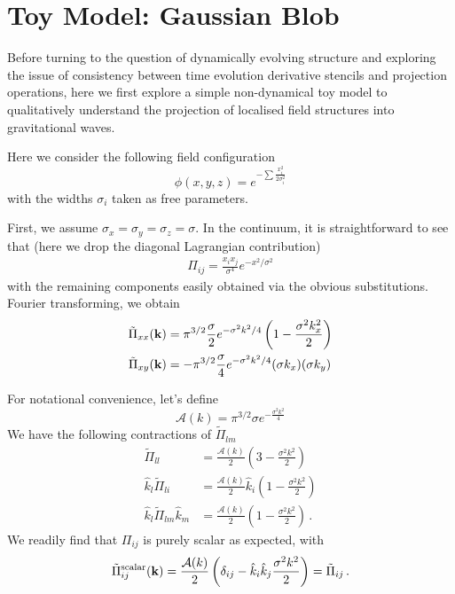 \documentclass{revtex4}
\begin{document}
\section{Toy Model: Gaussian Blob}
Before turning to the question of dynamically evolving structure and exploring the issue of consistency between time evolution derivative stencils and projection operations,
here we first explore a simple non-dynamical toy model to qualitatively understand the projection of localised field structures into gravitational waves.

Here we consider the following field configuration
\begin{equation}
  \phi(x,y,z) = e^{-\sum\frac{x_i^2}{2\sigma_i^2}}
\end{equation}
with the widths $\sigma_i$ taken as free parameters.

First, we assume $\sigma_x=\sigma_y=\sigma_z=\sigma$.
In the continuum, it is straightforward to see that (here we drop the diagonal Lagrangian contribution)
\begin{subequations}
\begin{align}
  \Pi_{ij} = \frac{x_ix_j}{\sigma^4}e^{-x^2/\sigma^2}
\end{align}
\end{subequations}
with the remaining components easily obtained via the obvious substitutions.
Fourier transforming, we obtain
\begin{align}
  \tilde{\Pi}_{xx}({\bf k}) &= \pi^{3/2}\frac{\sigma}{2}e^{-\sigma^2k^2/4}\left(1-\frac{\sigma^2k_x^2}{2}\right) \\
  \tilde{\Pi}_{xy}({\bf k}) &= -\pi^{3/2}\frac{\sigma}{4}e^{-\sigma^2k^2/4}(\sigma k_x)(\sigma k_y)
\end{align}

For notational convenience, let's define
\begin{equation}
  \mathcal{A}(k) = \pi^{3/2}\sigma e^{-\frac{\sigma^2k^2}{4}}
\end{equation}
We have the following contractions of $\tilde{\Pi}_{lm}$
\begin{subequations}
\begin{align}
  \tilde{\Pi}_{ll} &= \frac{\mathcal{A}(k)}{2}\left(3-\frac{\sigma^2k^2}{2}\right) \\
  \hat{k}_l\tilde{\Pi}_{li} &= \frac{\mathcal{A}(k)}{2}\hat{k}_i\left(1-\frac{\sigma^2k^2}{2}\right) \\
  \hat{k}_l\tilde{\Pi}_{lm}\hat{k}_m &= \frac{\mathcal{A}(k)}{2}\left(1-\frac{\sigma^2k^2}{2}\right) \, .
\end{align}
\end{subequations}
We readily find that $\Pi_{ij}$ is purely scalar as expected, with
\begin{equation}
  \tilde{\Pi}_{ij}^{{\rm scalar}}({\bf k}) = \frac{\mathcal{A}(k)}{2}\left(\delta_{ij}-\hat{k}_i\hat{k}_j\frac{\sigma^2k^2}{2}\right) = \tilde{\Pi}_{ij} \, .
\end{equation}
\end{document}
